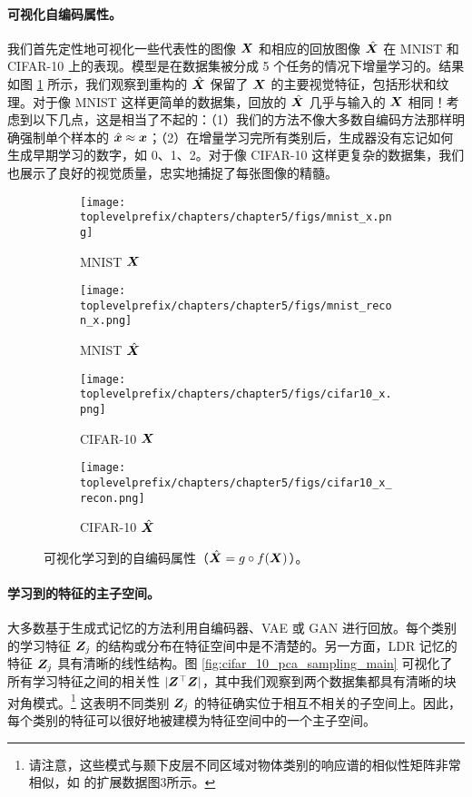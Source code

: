 \documentclass[../../book-main.tex]{subfiles}
\begin{document}
\paragraph{可视化自编码属性。}
我们首先定性地可视化一些代表性的图像 $\bm{X}$ 和相应的回放图像 $\hat{\bm{X}}$ 在 MNIST 和 CIFAR-10 上的表现。模型是在数据集被分成 5 个任务的情况下增量学习的。结果如图 \ref{fig:justifyx=x} 所示，我们观察到重构的 $\hat{\bm{X}}$ 保留了 $\bm{X}$ 的主要视觉特征，包括形状和纹理。对于像 MNIST 这样更简单的数据集，回放的 $\hat{\bm{X}}$ 几乎与输入的 $\bm{X}$ 相同！考虑到以下几点，这是相当了不起的：（1）我们的方法不像大多数自编码方法那样明确强制单个样本的 $\hat{\bm{x}} \approx \bm{x}$；（2）在增量学习完所有类别后，生成器没有忘记如何生成早期学习的数字，如 0、1、2。对于像 CIFAR-10 这样更复杂的数据集，我们也展示了良好的视觉质量，忠实地捕捉了每张图像的精髓。

\begin{figure}[t]
    \begin{subfigure}[t]{0.20\textwidth}
        \centering
        \texttt{[image: \\toplevelprefix/chapters/chapter5/figs/mnist\_x.png]}
        \caption{MNIST $\bm{X}$}
    \end{subfigure}
    \hfill
    \begin{subfigure}[t]{0.20\textwidth}
        \centering
        \texttt{[image: \\toplevelprefix/chapters/chapter5/figs/mnist\_recon\_x.png]}
        \caption{MNIST $\hat{\bm{X}}$}
    \end{subfigure}
    \hfill
    \begin{subfigure}[t]{0.20\textwidth}
        \centering
        \texttt{[image: \\toplevelprefix/chapters/chapter5/figs/cifar10\_x.png]}
        \caption{CIFAR-10 $\bm{X}$}
    \end{subfigure}
    \hfill
    \begin{subfigure}[t]{0.20\textwidth}
        \centering
        \texttt{[image: \\toplevelprefix/chapters/chapter5/figs/cifar10\_x\_recon.png]}
        \caption{CIFAR-10 $\hat{\bm{X}}$}
    \end{subfigure}
    \caption{\small 可视化学习到的自编码属性（$\hat{\bm{X}} = g\circ f(\bm{X})$）。}
        \label{fig:justifyx=x}
\end{figure}


\paragraph{学习到的特征的主子空间。}
大多数基于生成式记忆的方法利用自编码器、VAE 或 GAN 进行回放。每个类别的学习特征 $\bm{Z}_j$ 的结构或分布在特征空间中是不清楚的。另一方面，LDR 记忆的特征 $\bm{Z}_j$ 具有清晰的线性结构。图 \ref{fig:cifar_10_pca_sampling_main} 可视化了所有学习特征之间的相关性 $|\bm{Z}^\top\bm{Z}|$，其中我们观察到两个数据集都具有清晰的块对角模式。\footnote{请注意，这些模式与颞下皮层不同区域对物体类别的响应谱的相似性矩阵非常相似，如 \cite{Bao2020AMO} 的扩展数据图3所示。} 这表明不同类别 $\bm{Z}_j$ 的特征确实位于相互不相关的子空间上。因此，每个类别的特征可以很好地被建模为特征空间中的一个主子空间。%
\end{document}
